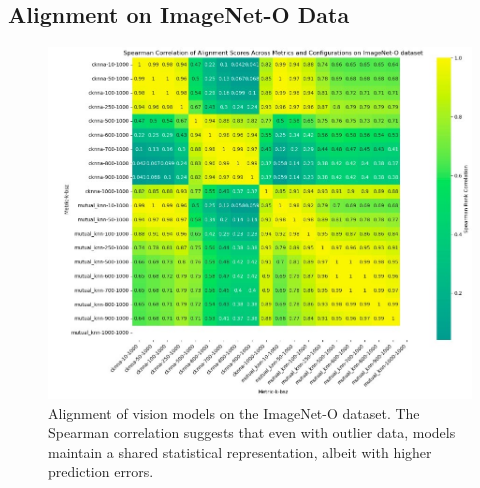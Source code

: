 \documentclass[10pt,a4paper]{article}
\begin{document}
\subsection{Alignment on ImageNet-O Data}
\begin{figure}[H]
    \centering
    \includegraphics[width=\textwidth]{prh_correlation_ood.jpg}
    \caption{Alignment of vision models on the ImageNet-O dataset. The Spearman correlation suggests that even with outlier data, models maintain a shared statistical representation, albeit with higher prediction errors.}
    \label{fig:prh_correlation_ood}
\end{figure}
\end{document}
